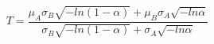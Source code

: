 \documentclass[10pt,a4paper]{article}
\begin{document}
	
	$$
	T = \frac{\mu_A \sigma_B \sqrt{-ln(1 - \alpha)}
	+ \mu_B \sigma_A \sqrt{-ln\alpha}}
	{\sigma_B \sqrt{-ln(1 - \alpha)} + \sigma_A \sqrt{-ln\alpha}}
	$$
	
\end{document}
